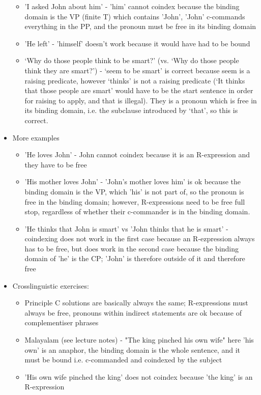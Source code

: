 \documentclass{article}
\begin{document}
\begin{itemize}
\begin{itemize}
        \item 'I asked John about him' - 'him' cannot coindex because the binding domain is the VP (finite T) which contains 'John', 'John' c-commands everything in the PP, and the pronoun must be free in its binding domain
        \item 'He left' - 'himself' doesn't work because it would have had to be bound
        \item `Why do those people think to be smart?' (vs. `Why do those people think they are smart?') - `seem to be smart' is correct because seem is a raising predicate, however `thinks' is not a raising predicate (`It thinks that those people are smart' would have to be the start sentence in order for raising to apply, and that is illegal). They is a pronoun which is free in its binding domain, i.e. the subclause introduced by `that', so this is correct.
    \end{itemize}
    \item More examples
    \begin{itemize}
        \item 'He loves John' - John cannot coindex because it is an R-expression and they have to be free
        \item 'His mother loves John' - 'John's mother loves him' is ok because the binding domain is the VP, which 'his' is not part of, so the pronoun is free in the binding domain; however, R-expressions need to be free full stop, regardless of whether their c-commander is in the binding domain.
        \item 'He thinks that John is smart' vs 'John thinks that he is smart' - coindexing does not work in the first case because an R-ezpression always has to be free, but does work in the second case because the binding domain of 'he' is the CP; 'John' is therefore outside of it and therefore free 
    \end{itemize}
    \item Crosslinguistic exercises:
    \begin{itemize}
        \item Principle C solutions are basically always the same; R-expressions must always be free, pronouns within indirect statements are ok because  of complementiser phrases
        \item Malayalam (see lecture notes) - "The king pinched his own wife" here 'his own' is an anaphor, the binding domain is the whole sentence, and it must be bound i.e. c-commanded and coindexed by the subject
        \item 'His own wife pinched the king' does not coindex because 'the king' is an R-expression

\end{itemize}
\end{itemize}
\end{document}
